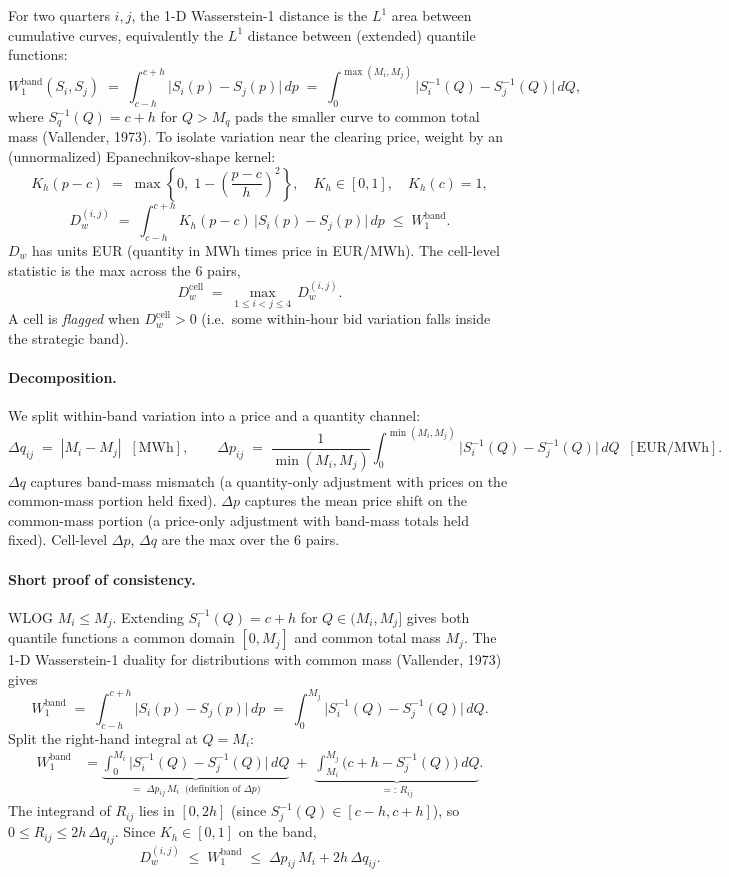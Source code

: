 \documentclass[11pt,a4paper]{article}
\begin{document}
For two quarters $i, j$, the 1-D Wasserstein-1 distance is the $L^1$ area between cumulative curves, equivalently the $L^1$ distance between (extended) quantile functions:
\[
  W^{\text{band}}_1(S_i, S_j) \;=\; \int_{c-h}^{c+h}\!\big|S_i(p)-S_j(p)\big|\,dp \;=\; \int_{0}^{\max(M_i, M_j)}\!\big|S_i^{-1}(Q)-S_j^{-1}(Q)\big|\,dQ,
\]
where $S_q^{-1}(Q) = c+h$ for $Q > M_q$ pads the smaller curve to common total mass (Vallender, 1973). To isolate variation near the clearing price, weight by an (unnormalized) Epanechnikov-shape kernel:
\[
  K_h(p-c) \;=\; \max\!\left\{0,\;1 - \!\left(\frac{p-c}{h}\right)^{\!2}\right\}, \quad K_h \in [0,1], \quad K_h(c)=1,
\]
\[
  D^{(i,j)}_w \;=\; \int_{c-h}^{c+h}\! K_h(p-c)\,\big|S_i(p)-S_j(p)\big|\,dp \;\le\; W^{\text{band}}_1.
\]
$D_w$ has units EUR (quantity in MWh times price in EUR/MWh). The cell-level statistic is the max across the 6 pairs,
\[
  D^{\text{cell}}_w \;=\; \max_{1\le i<j\le 4}\,D^{(i,j)}_w.
\]
A cell is \emph{flagged} when $D^{\text{cell}}_w > 0$ (i.e.\ some within-hour bid variation falls inside the strategic band).

\paragraph{Decomposition.}
We split within-band variation into a price and a quantity channel:
\[
  \Delta q_{ij} \;=\; |M_i - M_j|\;\;[\text{MWh}],
  \qquad
  \Delta p_{ij} \;=\; \frac{1}{\min(M_i, M_j)}\int_{0}^{\min(M_i, M_j)}\!\!\big|S_i^{-1}(Q) - S_j^{-1}(Q)\big|\,dQ\;\;[\text{EUR/MWh}].
\]
$\Delta q$ captures band-mass mismatch (a quantity-only adjustment with prices on the common-mass portion held fixed). $\Delta p$ captures the mean price shift on the common-mass portion (a price-only adjustment with band-mass totals held fixed). Cell-level $\Delta p$, $\Delta q$ are the max over the 6 pairs.

\paragraph{Short proof of consistency.}
WLOG $M_i \le M_j$. Extending $S_i^{-1}(Q) = c+h$ for $Q \in (M_i, M_j]$ gives both quantile functions a common domain $[0, M_j]$ and common total mass $M_j$. The 1-D Wasserstein-1 duality for distributions with common mass (Vallender, 1973) gives
\[
  W^{\text{band}}_1 \;=\; \int_{c-h}^{c+h}\!\big|S_i(p) - S_j(p)\big|\,dp
  \;=\; \int_{0}^{M_j}\!\big|S_i^{-1}(Q) - S_j^{-1}(Q)\big|\,dQ.
\]
Split the right-hand integral at $Q = M_i$:
\begin{align*}
  W^{\text{band}}_1
    &= \underbrace{\int_0^{M_i}\!\big|S_i^{-1}(Q) - S_j^{-1}(Q)\big|\,dQ}_{=\;\Delta p_{ij}\,M_i\;\;\text{(definition of $\Delta p$)}}
    \;+\; \underbrace{\int_{M_i}^{M_j}\!\big(c{+}h - S_j^{-1}(Q)\big)\,dQ}_{=:\,R_{ij}}.
\end{align*}
The integrand of $R_{ij}$ lies in $[0, 2h]$ (since $S_j^{-1}(Q) \in [c-h, c+h]$), so $0 \le R_{ij} \le 2h\,\Delta q_{ij}$. Since $K_h \in [0,1]$ on the band,
\[
  D^{(i,j)}_w \;\le\; W^{\text{band}}_1 \;\le\; \Delta p_{ij}\,M_i + 2h\,\Delta q_{ij}.
\]
\end{document}
